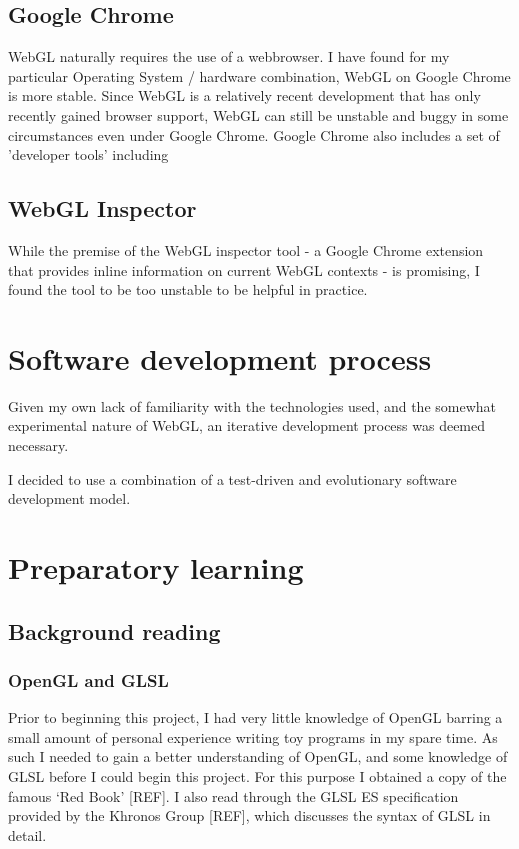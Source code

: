 \documentclass[12pt,twoside,notitlepage]{report}
\begin{document}
\subsection*{Google Chrome}
WebGL naturally requires the use of a webbrowser. I have found for my particular Operating System / hardware combination, WebGL on Google Chrome is more stable. Since WebGL is a relatively recent development that has only recently gained browser support, WebGL can still be unstable and buggy in some circumstances even under Google Chrome. Google Chrome also includes a set of 'developer tools' including 

\subsection*{WebGL Inspector}
While the premise of the WebGL inspector tool - a Google Chrome extension that provides inline information on current WebGL contexts - is promising, I found the tool to be too unstable to be helpful in practice.

\section{Software development process}
Given my own lack of familiarity with the technologies used, and the somewhat experimental nature of WebGL, an iterative development process was deemed necessary.

I decided to use a combination of a test-driven and evolutionary software development model.

\section{Preparatory learning}
\subsection{Background reading}

\subsubsection{OpenGL and GLSL}
Prior to beginning this project, I had very little knowledge of OpenGL barring a small amount of personal experience writing toy programs in my spare time. As such I needed to gain a better understanding of OpenGL, and some knowledge of GLSL before I could begin this project. For this purpose I obtained a copy of the famous `Red Book' [REF]. I also read through the GLSL ES specification provided by the Khronos Group [REF], which discusses the syntax of GLSL in detail.
\end{document}
